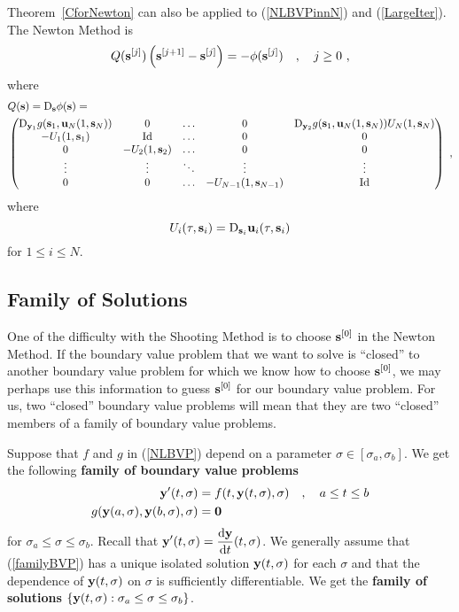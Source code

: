 \begin{rmk}
Theorem~\ref{CforNewton} can also be applied to
(\ref{NLBVPinnN}) and (\ref{LargeIter}). The Newton Method is
\[
Q(\mathbf{s}^{[j]}) \left( \mathbf{s}^{[j+1]} - \mathbf{s}^{[j]} \right) =
-\phi(\mathbf{s}^{[j]}) \quad , \quad j \geq 0 \ ,
\]
where
\begin{align*}
&Q(\mathbf{s}) = \mathrm{D}_{\mathbf{s}} \phi(\mathbf{s}) = \\
&\begin{pmatrix}
\mathrm{D}_{\mathbf{y}_1}g(\mathbf{s}_1,\mathbf{u}_N(1,\mathbf{s}_N))
& 0 & \ldots & 0 &
\mathrm{D}_{\mathbf{y}_2}g(\mathbf{s}_1,\mathbf{u}_N(1,\mathbf{s}_N))U_N(1,\mathbf{s}_N) \\
-U_1(1,\mathbf{s}_1) & \operatorname{Id} &  \ldots & 0 & 0 \\
0 & -U_2(1,\mathbf{s}_2) &  \ldots & 0 & 0\\
\vdots & \vdots & \ddots & \vdots & \vdots \\
0 & 0 & \ldots & -U_{N-1}(1,\mathbf{s}_{N-1}) & \operatorname{Id} \\
\end{pmatrix}\ ,
\end{align*}
where
\[
  U_i(\tau,\mathbf{s}_i) = \mathrm{D}_{\mathbf{s}_i} \mathbf{u}_i(\tau,\mathbf{s}_i)
\]
for $1\leq i \leq N$.
\end{rmk}

\subsection{Family of Solutions}

One of the difficulty with the Shooting Method is to choose
$\mathbf{s}^{[0]}$ in the Newton Method.  If the boundary value problem
that we want to solve is ``closed'' to another boundary value problem
for which we know how to choose $\mathbf{s}^{[0]}$, we may perhaps use
this information to guess $\mathbf{s}^{[0]}$ for our boundary value
problem.  For us, two ``closed'' boundary value problems will mean
that they are two ``closed'' members of a family of boundary value
problems.

Suppose that $f$ and $g$ in (\ref{NLBVP}) depend on a
parameter $\sigma \in [\sigma_a,\sigma_b]$.  We get the following
{\bfseries family of boundary value problems} 
\begin{equation} \label{familyBVP}
\begin{split}
\mathbf{y}'(t,\sigma) & = f(t,\mathbf{y}(t,\sigma),\sigma)
\quad , \quad a \leq t \leq b \\
g(\mathbf{y}(a,\sigma),\mathbf{y}(b,\sigma),\sigma) &= \mathbf{0}
\end{split}
\end{equation}
for $\sigma_a \leq \sigma \leq \sigma_b$.  Recall that
$\displaystyle \mathbf{y}'(t,\sigma) = \frac{\mathrm{d}\mathbf{y}}{\mathrm{d}{t}}(t,\sigma)$.
We generally assume that
(\ref{familyBVP}) has a unique isolated solution
$\mathbf{y}(t,\sigma)$ for each $\sigma$ and that the dependence of
$\mathbf{y}(t,\sigma)$ on $\sigma$ is sufficiently differentiable.  We get the
{\bfseries family of solutions}
$\{ \mathbf{y}(t,\sigma) : \sigma_a \leq \sigma \leq \sigma_b\}$.

